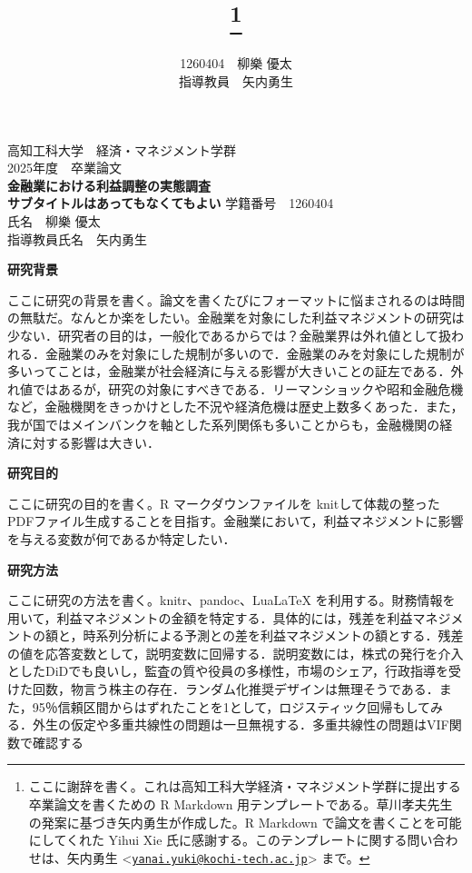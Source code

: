 \documentclass[10.5pt,a4paper,lualatex,ja=standard]{bxjsarticle}
\title{\vspace{-28pt}{\Large\gtfamily\bfseries 金融業における利益調整の実態調査}\thanks{ここに謝辞を書く。これは高知工科大学経済・マネジメント学群に提出する卒業論文を書くための R Markdown 用テンプレートである。草川孝夫先生の発案に基づき矢内勇生が作成した。R Markdown で論文を書くことを可能にしてくれた Yihui Xie 氏に感謝する。このテンプレートに関する問い合わせは、矢内勇生 \textless{}\href{mailto:yanai.yuki@kochi-tech.ac.jp}{\nolinkurl{yanai.yuki@kochi-tech.ac.jp}}\textgreater{} まで。}}
\subtitle{\large\gtfamily\bfseries \vskip 0.4em サブタイトルはあってもなくてもよい\vspace{-8pt}}
\author{\large 1260404　柳樂 優太\\ 指導教員　矢内勇生}
\date{} %
\begin{document}
\thispagestyle{empty}
\begin{center}
\Large
高知工科大学　経済・マネジメント学群 \\
2025年度　卒業論文\\
\vspace{36truemm}
{\LARGE\gtfamily\bfseries 金融業における利益調整の実態調査}\\
\vspace{4truemm}
  {\Large\gtfamily\bfseries サブタイトルはあってもなくてもよい}
\vfill
学籍番号　1260404 \\
\vspace{4truemm}
氏名　柳樂 優太 \\
\vspace{8truemm}
指導教員氏名　矢内勇生
\end{center}

\newpage
\maketitle
\thispagestyle{empty} %

\noindent
\textbf{研究背景}

ここに研究の背景を書く。論文を書くたびにフォーマットに悩まされるのは時間の無駄だ。なんとか楽をしたい。金融業を対象にした利益マネジメントの研究は少ない．研究者の目的は，一般化であるからでは？金融業界は外れ値として扱われる．金融業のみを対象にした規制が多いので．金融業のみを対象にした規制が多いってことは，金融業が社会経済に与える影響が大きいことの証左である．外れ値ではあるが，研究の対象にすべきである．リーマンショックや昭和金融危機など，金融機関をきっかけとした不況や経済危機は歴史上数多くあった．また，我が国ではメインバンクを軸とした系列関係も多いことからも，金融機関の経済に対する影響は大きい．

\vspace{4truemm}
\noindent
\textbf{研究目的}

ここに研究の目的を書く。R マークダウンファイルを knitして体裁の整ったPDFファイル生成することを目指す。金融業において，利益マネジメントに影響を与える変数が何であるか特定したい．

\vspace{4truemm}
\noindent
\textbf{研究方法}

ここに研究の方法を書く。knitr、pandoc、LuaLaTeX を利用する。財務情報を用いて，利益マネジメントの金額を特定する．具体的には，残差を利益マネジメントの額と，時系列分析による予測との差を利益マネジメントの額とする．残差の値を応答変数として，説明変数に回帰する．説明変数には，株式の発行を介入としたDiDでも良いし，監査の質や役員の多様性，市場のシェア，行政指導を受けた回数，物言う株主の存在．ランダム化推奨デザインは無理そうである．また，95％信頼区間からはずれたことを1として，ロジスティック回帰もしてみる．外生の仮定や多重共線性の問題は一旦無視する．多重共線性の問題はVIF関数で確認する
\end{document}
